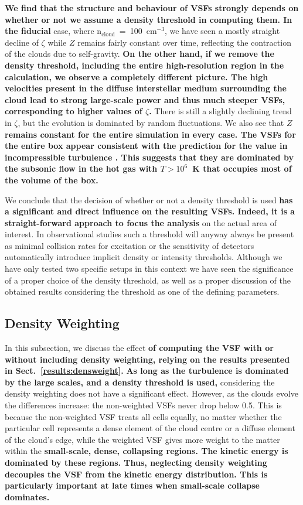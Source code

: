 \textbf{We find that the structure and behaviour of VSFs strongly depends on whether or not we assume a density threshold in computing them.
In the fiducial} case, where n$_\mathrm{cloud}$~=~100~cm$^{-3}$, we have seen a mostly straight decline of $\zeta$ while $Z$ remains fairly constant over time, reflecting the contraction of the clouds due to self-gravity.
\textbf{On the other hand, if we remove the density threshold, including the entire high-resolution region in the calculation, we observe a completely different picture.
The high velocities present in the diffuse interstellar medium surrounding the cloud lead to strong large-scale power and thus much steeper VSFs, corresponding to higher values of $\zeta$. }
There is still a slightly declining trend in $\zeta$, but the evolution is dominated by random fluctuations.
We also see that \textbf{$Z$ remains constant for the entire simulation in every case.
The VSFs for the entire box appear consistent with the prediction for the value in incompressible turbulence \citep{Boldyrev2002}. This suggests that they are dominated by the subsonic flow in the hot gas with $T > 10^6$~K that occupies most of the volume of the box.}

We conclude that the decision of whether or not a density threshold is used \textbf{has a significant and direct influence on the resulting VSFs.
Indeed, it is a straight-forward approach to focus the analysis} on the actual area of interest.
In observational studies such a threshold will anyway always be present as minimal collision rates for excitation or the sensitivity of detectors automatically introduce implicit density or intensity thresholds. 
Although we have only tested two specific setups in this context we have seen the significance of a proper choice of the density threshold, as well as a proper discussion of the obtained results considering the threshold as one of the defining parameters.

\subsection{Density Weighting}\label{discussion:densweight}


In this subsection, we discuss the effect \textbf{of computing the VSF with or without including density weighting, relying on the results presented in Sect.~\ref{results:densweight}.}
\textbf{As long as the turbulence is dominated by the large scales, and a density threshold is used,} considering the density weighting does not have a significant effect.
However, as the clouds evolve the differences increase:
the non-weighted VSFs never drop below 0.5.
This is because the non-weighted VSF treats all cells equally, no matter whether the particular cell represents a dense element of the cloud centre or a diffuse element of the cloud's edge, while the weighted VSF gives more weight to the matter within the \textbf{small-scale, dense, collapsing regions.
The kinetic energy is dominated by these regions.
Thus, neglecting density weighting decouples the VSF from the kinetic energy distribution. 
This is particularly important at late times when small-scale collapse dominates.}


